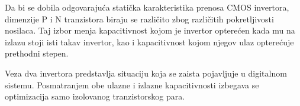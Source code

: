 Da bi se dobila odgovarajuća statička karakteristika prenosa CMOS invertora, dimenzije P i N tranzistora biraju se različito zbog različitih pokretljivosti nosilaca. Taj izbor menja kapacitivnost kojom je invertor opterećen kada mu na izlazu stoji isti takav invertor, kao i kapacitivnost kojom njegov ulaz opterećuje prethodni stepen.

Veza dva invertora predstavlja situaciju koja se zaista pojavljuje u digitalnom sistemu. Posmatranjem obe ulazne i izlazne kapacitivnosti izbegava se optimizacija samo izolovanog tranzistorskog para.
